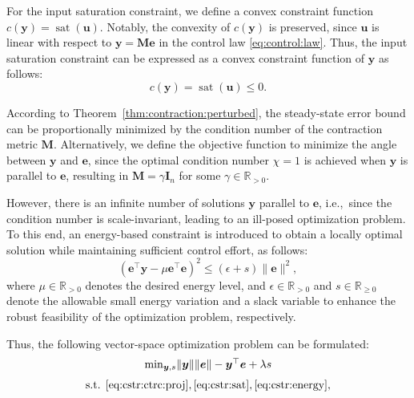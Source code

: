 \documentclass{ifacconf}
\newcommand\ie{\textrm{i.e.,\ }}
\newcommand\R{\mathbb{R}}
\newcommand*{\mv}[1]{\boldsymbol{#1}} %
\newcommand*{\mm}[1]{\boldsymbol{#1}} %
\newcommand*{\norm}[1]{\lVert #1 \rVert} %
\DeclareMathOperator{\mysat}{{sat}}       %
\begin{document}
For the input saturation constraint, we define a convex constraint function $c(\mv{y})=\mysat(\mv{u})$.
Notably, the convexity of $c(\mv{y})$ is preserved, since $\mv{u}$ is linear with respect to $\mv{y}=\mm{M}\mv{e}$ in the control law \eqref{eq:control:law}.
Thus, the input saturation constraint can be expressed as a convex constraint function of $\mv{y}$ as follows:
\begin{equation} \label{eq:cstr:sat}
   c(\mv{y})
   =
   \mysat(\mv{u})  
   \le 0
   .
\end{equation}

According to Theorem~\ref{thm:contraction:perturbed}, the steady-state error bound can be proportionally minimized by the condition number of the contraction metric $\mm{M}$.
Alternatively, we define the objective function to minimize the angle between $\mv{y}$ and $\mv{e}$, since the optimal condition number $\chi=1$ is achieved when $\mv{y}$ is parallel to $\mv{e}$, resulting in $\mm{M}=\gamma \mm{I}_n$ for some $\gamma\in\R_{>0}$.

However, there is an infinite number of solutions $\mv{y}$ parallel to $\mv{e}$, \ie since the condition number is scale-invariant, leading to an ill-posed optimization problem.
To this end, an energy-based constraint is introduced to obtain a locally optimal solution while maintaining sufficient control effort, as follows:
\begin{equation} \label{eq:cstr:energy}
   \left(
      \mv{e}^\top \mv{y} 
      -
      \mu \mv{e}^\top \mv{e}
   \right)^2
   \le
   (\epsilon + s) \norm{\mv{e}}^2
   ,
\end{equation}
where $\mu\in\R_{>0}$ denotes the desired energy level, and $\epsilon\in\R_{>0}$ and $s\in\R_{\ge0}$ denote the allowable small energy variation and a slack variable to enhance the robust feasibility of the optimization problem, respectively.

Thus, the following vector-space optimization problem can be formulated:
\begin{equation} \label{eq:opt:main}
   \begin{matrix}
      \min_{
         \mv{y},s
         } 
      \norm{\mv{y}}\norm{\mv{e}} - \mv{y}^\top \mv{e}
      +
      \lambda s
      \\ 
      \vspace{-.2cm}
      \\
      \text{s.t. }
         \eqref{eq:cstr:ctrc:proj}
         ,
         \eqref{eq:cstr:sat}
         ,
         \eqref{eq:cstr:energy}
         ,
   \end{matrix}
\end{equation}
\end{document}
